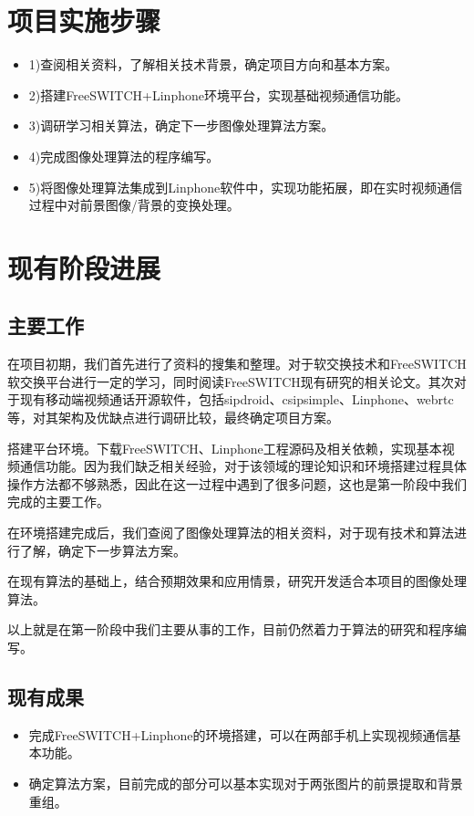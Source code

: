 \documentclass[12pt]{extarticle}
\newcommand{\<}{\langle}
\renewcommand{\>}{\rangle}
\theoremstyle{definition}
\begin{document}
\section{项目实施步骤}
\begin{itemize}
\item 1)查阅相关资料，了解相关技术背景，确定项目方向和基本方案。
\item 2)搭建FreeSWITCH+Linphone环境平台，实现基础视频通信功能。
\item 3)调研学习相关算法，确定下一步图像处理算法方案。
\item 4)完成图像处理算法的程序编写。
\item 5)将图像处理算法集成到Linphone软件中，实现功能拓展，即在实时视频通信过程中对前景图像/背景的变换处理。
\end{itemize}

\section{现有阶段进展}
\subsection{主要工作}
\par{\qquad 在项目初期，我们首先进行了资料的搜集和整理。对于软交换技术和FreeSWITCH软交换平台进行一定的学习，同时阅读FreeSWITCH现有研究的相关论文。其次对于现有移动端视频通话开源软件，包括sipdroid、csipsimple、Linphone、webrtc等，对其架构及优缺点进行调研比较，最终确定项目方案。}
\par{搭建平台环境。下载FreeSWITCH、Linphone工程源码及相关依赖，实现基本视频通信功能。因为我们缺乏相关经验，对于该领域的理论知识和环境搭建过程具体操作方法都不够熟悉，因此在这一过程中遇到了很多问题，这也是第一阶段中我们完成的主要工作。}
\par{在环境搭建完成后，我们查阅了图像处理算法的相关资料，对于现有技术和算法进行了解，确定下一步算法方案。}
\par{在现有算法的基础上，结合预期效果和应用情景，研究开发适合本项目的图像处理算法。}
\par{以上就是在第一阶段中我们主要从事的工作，目前仍然着力于算法的研究和程序编写。}
\subsection{现有成果}
\begin{itemize}
\item 完成FreeSWITCH+Linphone的环境搭建，可以在两部手机上实现视频通信基本功能。
\item 确定算法方案，目前完成的部分可以基本实现对于两张图片的前景提取和背景重组。
\end{itemize}
\end{document}
